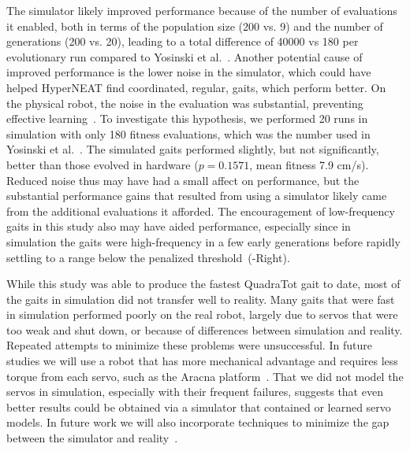 The simulator likely improved performance because of the number of evaluations it enabled, both in terms of the population size (200 vs. 9) and the number of generations (200 vs. 20), leading
to a total difference of 40000 vs 180 per evolutionary run compared to Yosinski et al.~\cite{yos:clune}. Another
potential cause of improved performance is the lower noise in the simulator, which could have helped HyperNEAT find coordinated, regular, gaits, which perform better. On the physical robot, the noise in the evaluation was
substantial, preventing effective learning~\cite{yos:clune}. 
To investigate this hypothesis, we performed 20 runs in simulation with only 180 fitness evaluations, which was the number used in Yosinski et al.~\cite{yos:clune}. The simulated gaits performed
slightly, but not significantly, better than those evolved in hardware ($p = 0.1571$, mean fitness 7.9 cm/s).
Reduced noise thus may have had a small affect on performance, but the substantial performance gains that resulted from using a simulator likely came from the additional evaluations it afforded.
The encouragement of low-frequency gaits in this study
also may have aided performance, especially since in simulation the gaits were
high-frequency in a few early generations before rapidly settling to a
 range below the penalized threshold~(-Right).



While this study was able to produce the fastest QuadraTot gait to
date, most of the gaits in simulation did not transfer well to
reality. Many gaits that were fast in simulation performed
poorly on the real robot, largely due to servos that were too weak and
shut down, or because of differences between simulation and
reality. Repeated attempts to minimize these problems were
unsuccessful. 
In future studies we will use a
robot that has more mechanical advantage and requires less torque from
each servo, such as the Aracna platform~\cite{lohmann2012aracna}.
That we did not model the servos in simulation, especially with their frequent failures, suggests that even better results could be obtained via a simulator that contained or learned servo models. In future work we will also incorporate techniques to minimize the gap between the simulator and reality~\cite{koos2010crossing,bongard,zagal,koos2011transferability}.
